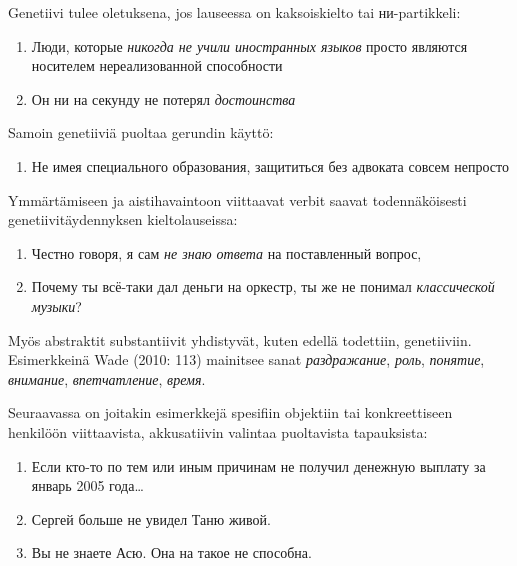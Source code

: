 \documentclass[]{scrartcl}
\providecommand{\tightlist}{%
  \setlength{\itemsep}{0pt}\setlength{\parskip}{0pt}}
\begin{document}
Genetiivi tulee oletuksena, jos lauseessa on kaksoiskielto tai
ни-partikkeli:

\begin{enumerate}
\def\labelenumi{(\arabic{enumi})}
\setcounter{enumi}{62}
\tightlist
\item
  Люди, которые \emph{никогда не учили иностранных языков} просто
  являются носителем нереализованной способности
\item
  Он ни на секунду не потерял \emph{достоинства}
\end{enumerate}

Samoin genetiiviä puoltaa gerundin käyttö:

\begin{enumerate}
\def\labelenumi{(\arabic{enumi})}
\setcounter{enumi}{64}
\tightlist
\item
  Не имея специального образования, защититься без адвоката совсем
  непросто
\end{enumerate}

Ymmärtämiseen ja aistihavaintoon viittaavat verbit saavat
todennäköisesti genetiivitäydennyksen kieltolauseissa:

\begin{enumerate}
\def\labelenumi{(\arabic{enumi})}
\setcounter{enumi}{65}
\tightlist
\item
  Честно говоря, я сам \emph{не знаю ответа} на поставленный вопрос,
\item
  Почему ты всё-таки дал деньги на оркестр, ты же не понимал
  \emph{классической музыки}?
\end{enumerate}

Myös abstraktit substantiivit yhdistyvät, kuten edellä todettiin,
genetiiviin. Esimerkkeinä Wade (2010: 113) mainitsee sanat
\emph{раздражание}, \emph{роль}, \emph{понятие}, \emph{внимание},
\emph{впетчатление}, \emph{время}.

Seuraavassa on joitakin esimerkkejä spesifiin objektiin tai
konkreettiseen henkilöön viittaavista, akkusatiivin valintaa puoltavista
tapauksista:

\begin{enumerate}
\def\labelenumi{(\arabic{enumi})}
\setcounter{enumi}{67}
\tightlist
\item
  Если кто-то по тем или иным причинам не получил денежную выплату за
  январь 2005 года\ldots{}
\item
  Сергей больше не увидел Таню живой.
\item
  Вы не знаете Асю. Она на такое не способна.
\end{enumerate}
\end{document}
